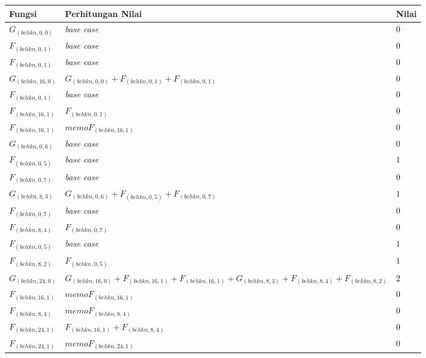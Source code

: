 \begin{appendices}
  \begin{table}[H]
  	\centering
  	\begin{tabular} {|p{3cm}|p{5cm}|p{1cm}|} \hline
  		Fungsi & Perhitungan Nilai & Nilai \\ \hline
  		$ G_{(behkn, 0, 0)} $ & \textit{base case} & $ 0 $ \\ \hline
  		$ F_{(behkn, 0, 1)} $ & \textit{base case} & $ 0 $ \\ \hline
  		$ F_{(behkn, 0, 1)} $ & \textit{base case} & $ 0 $ \\ \hline
  		$ G_{(behkn, 16, 0)}  $ & $G_{(behkn, 0, 0)} + F_{(behkn, 0, 1)} + F_{(behkn, 0, 1)}$ & $ 0 $ \\ \hline
  		$ F_{(behkn, 0, 1)} $ & \textit{base case} & $ 0 $ \\ \hline
  		$ F_{(behkn, 16, 1)}  $ & $F_{(behkn, 0, 1)}$ & $ 0 $ \\ \hline
  		$ F_{(behkn, 16, 1)}  $ & $memoF_{(behkn, 16, 1)}$ & $ 0 $ \\ \hline
  		$ G_{(behkn, 0, 6)} $ & \textit{base case} & $ 0 $ \\ \hline
  		$ F_{(behkn, 0, 5)} $ & \textit{base case} & $ 1 $ \\ \hline
  		$ F_{(behkn, 0, 7)} $ & \textit{base case} & $ 0 $ \\ \hline
  		$ G_{(behkn, 8, 3)}  $ & $G_{(behkn, 0, 6)} + F_{(behkn, 0, 5)} + F_{(behkn, 0, 7)}$ & $ 1 $ \\ \hline
  		$ F_{(behkn, 0, 7)} $ & \textit{base case} & $ 0 $ \\ \hline
  		$ F_{(behkn, 8, 4)}  $ & $F_{(behkn, 0, 7)}$ & $ 0 $ \\ \hline
  		$ F_{(behkn, 0, 5)} $ & \textit{base case} & $ 1 $ \\ \hline
  		$ F_{(behkn, 8, 2)}  $ & $F_{(behkn, 0, 5)}$ & $ 1 $ \\ \hline
  		$ G_{(behkn, 24, 0)}  $ & $G_{(behkn, 16, 0)} + F_{(behkn, 16, 1)} + F_{(behkn, 16, 1)} + G_{(behkn, 8, 3)} + F_{(behkn, 8, 4)} + F_{(behkn, 8, 2)}$ & $ 2 $ \\ \hline
  		$ F_{(behkn, 16, 1)}  $ & $memoF_{(behkn, 16, 1)}$ & $ 0 $ \\ \hline
  		$ F_{(behkn, 8, 4)}  $ & $memoF_{(behkn, 8, 4)}$ & $ 0 $ \\ \hline
  		$ F_{(behkn, 24, 1)}  $ & $F_{(behkn, 16, 1)} + F_{(behkn, 8, 4)}$ & $ 0 $ \\ \hline
  		$ F_{(behkn, 24, 1)}  $ & $memoF_{(behkn, 24, 1)}$ & $ 0 $ \\ \hline

\end{tabular}
\end{table}
\end{appendices}
